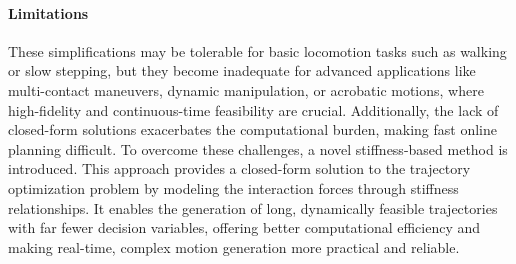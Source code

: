 \documentclass[main.tex]{subfiles}
\begin{document}
\paragraph{Limitations} These simplifications may be tolerable for basic locomotion tasks such as walking or slow stepping, but they become inadequate for advanced applications like multi-contact maneuvers, dynamic manipulation, or acrobatic motions, where high-fidelity and continuous-time feasibility are crucial. Additionally, the lack of closed-form solutions exacerbates the computational burden, making fast online planning difficult. To overcome these challenges, a novel stiffness-based method is introduced. This approach provides a closed-form solution to the trajectory optimization problem by modeling the interaction forces through stiffness relationships. It enables the generation of long, dynamically feasible trajectories with far fewer decision variables, offering better computational efficiency and making real-time, complex motion generation more practical and reliable.
\end{document}
